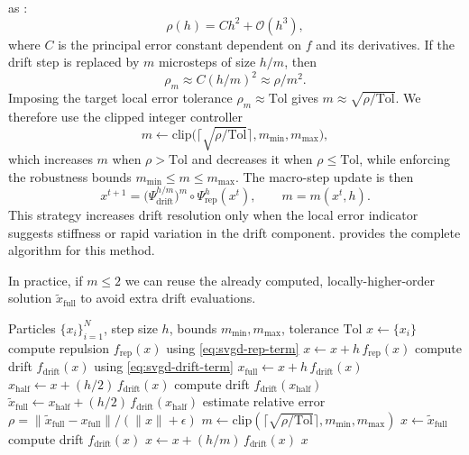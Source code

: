 as \cite[Ch. II.4]{Hairer_book_I}:
\[
\rho(h) = C h^2 + \mathcal{O}(h^3),
\]
where $C$ is the principal error constant dependent on $f$ and its derivatives. If the drift step is replaced by $m$ microsteps of size $h/m$, then
\[
\rho_m \approx C(h/m)^2 \approx \rho/m^2.
\]
Imposing the target local error tolerance $\rho_m \approx \text{Tol}$ gives
$m \approx \sqrt{\rho/\text{Tol}}$. We therefore use the clipped integer
controller
\begin{equation}
  m \leftarrow \mathrm{clip}\Big(\Big\lceil \sqrt{\rho/\text{Tol}}\Big\rceil,
  m_{\min}, m_{\max}\Big),
  \label{eq:adapt-mr-m}
\end{equation}
which increases $m$ when $\rho>\text{Tol}$ and decreases it when
$\rho\le\text{Tol}$, while enforcing the robustness bounds
$m_{\min}\le m\le m_{\max}$.
The macro-step update is then
\begin{equation}
  x^{t+1}
  = \Big(\Psi_{\text{drift}}^{h/m}\Big)^m\circ\Psi_{\text{rep}}^{h}(x^t),
  \qquad m = m(x^t,h).
  \label{eq:adapt-mr-step}
\end{equation}
This
strategy increases drift resolution only when the local error indicator suggests
stiffness or rapid variation in the drift component.   provides the complete algorithm for this method.


\begin{remark}
In practice, if $m\le 2$ we can reuse the already computed, locally-higher-order solution $\tilde{x}_{\text{full}} $ to avoid extra drift evaluations.
\end{remark}

\begin{algorithm}[t]
\caption{Adaptive multirate SVGD (Adapt-MR-SVGD)}
\label{alg:adapt_mr_svgd}
\begin{algorithmic}[1]
\Require Particles $\{x_i\}_{i=1}^N$, step size $h$, bounds $m_{\min}, m_{\max}$, tolerance $\text{Tol}$
\State $x \leftarrow \{x_i\}$
\State compute repulsion $f_{\text{rep}}(x)$ using \cref{eq:svgd-rep-term}
\State $x \leftarrow x + h\,f_{\text{rep}}(x)$
\State compute drift $f_{\text{drift}}(x)$ using \cref{eq:svgd-drift-term}
\State $x_{\text{full}} \leftarrow x + h\,f_{\text{drift}}(x)$
\State $x_{\text{half}} \leftarrow x + (h/2)\,f_{\text{drift}}(x)$
\State compute drift $f_{\text{drift}}(x_{\text{half}})$
\State $\tilde{x}_{\text{full}} \leftarrow x_{\text{half}} + (h/2)\,f_{\text{drift}}(x_{\text{half}})$
\State estimate relative error $\rho = \|\tilde{x}_{\text{full}} - x_{\text{full}}\| / (\|x\| + \epsilon)$
\State $m \leftarrow \mathrm{clip}(\lceil \sqrt{\rho/\text{Tol}} \rceil, m_{\min}, m_{\max})$
  \State $x \leftarrow \tilde{x}_{\text{full}}$ 
\Else
    \State compute drift $f_{\text{drift}}(x)$
    \State $x \leftarrow x + (h/m)\,f_{\text{drift}}(x)$
  \EndFor
\EndIf
\State \Return $x$
\end{algorithmic}
\end{algorithm}
